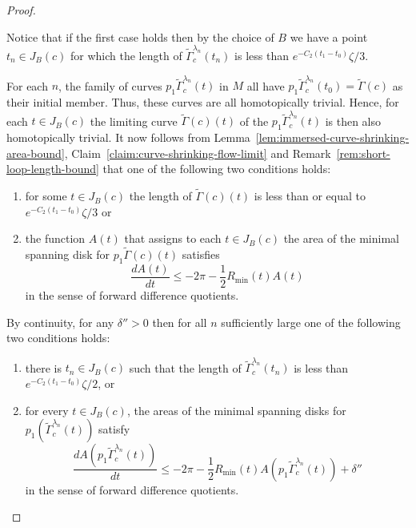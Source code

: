 \begin{proof}
\begin{remark}
\label{rem:short-loop-length-bound}
\label{xicomp}
Notice that if the first case holds then by the choice of $B$ we
have a point $t_n\in J_B(c)$ for which the length of
$\widetilde\Gamma_c^{\lambda_n}(t_n)$ is less than
$e^{-C_2(t_1-t_0)}\zeta/3$.
\end{remark}


For each $n$,  the family of curves
$p_1\widetilde\Gamma_c^{\lambda_n}(t)$  in $M$ all have
$p_1\widetilde\Gamma_c^{\lambda_n}(t_0)=\widetilde\Gamma(c)$ as
their initial member. Thus, these curves are all homotopically
trivial. Hence, for each $t\in J_B(c)$ the limiting curve
$\widetilde\Gamma(c)(t)$ of the
$p_1\widetilde\Gamma_c^{\lambda_n}(t)$ is then also homotopically
trivial. It now follows from Lemma~\ref{lem:immersed-curve-shrinking-area-bound},
Claim~\ref{claim:curve-shrinking-flow-limit} and Remark~\ref{rem:short-loop-length-bound} that one of the
following two conditions holds:
\begin{enumerate}
\item[(1)] for some $t\in J_B(c)$ the length of $\widetilde\Gamma(c)(t)$ is less than or equal to
 $e^{-C_2(t_1-t_0)}\zeta/3$ or
\item[(2)] the function $A(t)$ that assigns to each $t\in
J_B(c)$ the area of the minimal spanning disk for
$p_1\widetilde\Gamma(c)(t)$ satisfies
$$\frac{dA(t)}{dt}\le -2\pi-\frac{1}{2}R_{\min}(t)A(t)$$
in the sense of forward difference quotients.
\end{enumerate}
By continuity,  for any $\delta''>0$ then for all $n$
 sufficiently large one of the following two conditions holds:
\begin{enumerate}
\item[(1)] there is $t_n\in J_B(c)$ such that the length of $\widetilde\Gamma_c^{\lambda_n}(t_n)$
is less than $e^{-C_2(t_1-t_0)}\zeta/2$, or
\item[(2)]  for every $t\in J_B(c)$, the areas of the minimal
spanning disks for $p_1(\widetilde\Gamma_c^{\lambda_n}(t))$ satisfy
$$\frac{dA(p_1\widetilde\Gamma_c^{\lambda_n}(t))}{dt}\le -2\pi-\frac{1}{2}R_\mathrm{min}(t)A(p_1\widetilde\Gamma_c^{\lambda_n}(t))+\delta''$$ in the
sense of forward difference quotients.
\end{enumerate}


\end{proof}
